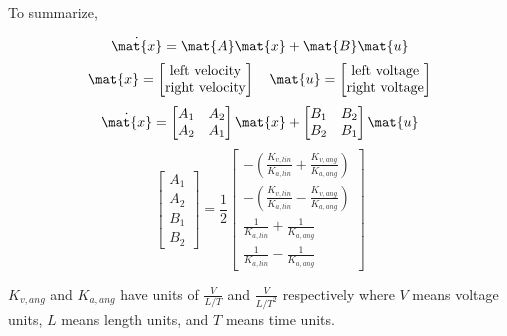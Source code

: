 To summarize,
\begin{theorem}
  \begin{equation*}
    \dot{\mat{x}} = \mat{A}\mat{x} + \mat{B}\mat{u}
  \end{equation*}
  \begin{equation*}
    \mat{x} =
    \begin{bmatrix}
      \text{left velocity} \\
      \text{right velocity}
    \end{bmatrix}
    \quad
    \mat{u} =
    \begin{bmatrix}
      \text{left voltage} \\
      \text{right voltage}
    \end{bmatrix}
  \end{equation*}
  \begin{equation*}
    \dot{\mat{x}} =
    \begin{bmatrix}
      A_1 & A_2 \\
      A_2 & A_1
    \end{bmatrix} \mat{x} +
    \begin{bmatrix}
      B_1 & B_2 \\
      B_2 & B_1
    \end{bmatrix} \mat{u}
  \end{equation*}
  \begin{equation}
    \begin{bmatrix}
      A_1 \\
      A_2 \\
      B_1 \\
      B_2
    \end{bmatrix} = \frac{1}{2}
    \begin{bmatrix}
      -\left(\frac{K_{v,lin}}{K_{a,lin}} +
        \frac{K_{v,ang}}{K_{a,ang}}\right) \\
      -\left(\frac{K_{v,lin}}{K_{a,lin}} -
        \frac{K_{v,ang}}{K_{a,ang}}\right) \\
      \frac{1}{K_{a,lin}} + \frac{1}{K_{a,ang}} \\
      \frac{1}{K_{a,lin}} - \frac{1}{K_{a,ang}}
    \end{bmatrix}
  \end{equation}

  $K_{v,ang}$ and $K_{a,ang}$ have units of $\frac{V}{L/T}$ and
  $\frac{V}{L/T^2}$ respectively where $V$ means voltage units, $L$ means length
  units, and $T$ means time units.
\end{theorem}

